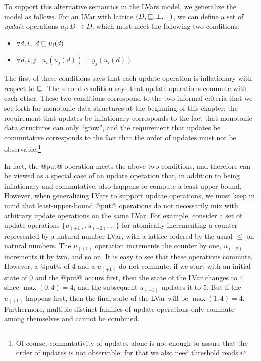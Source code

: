 To support this alternative semantics in the LVars model, we
generalize the model as follows.  For an LVar with lattice $(D,
\sqsubseteq, \bot, \top)$, we can define a set of \emph{update}
operations $u_i : D \rightarrow D$, which must meet the following two
conditions:
\begin{itemize}
\item $\forall d, i.     \;\; d \sqsubseteq u_i(d) $
\item $\forall d, i, j.  \;\; u_i(u_j(d)) = y_j(u_i(d)) $
\end{itemize}
The first of these conditions says that each update operation is
inflationary with respect to $\sqsubseteq$.  The second condition says
that update operations commute with each other.  These two conditions
correspond to the two informal criteria that we set forth for
monotonic data structures at the beginning of this chapter: the
requirement that updates be inflationary corresponds to the fact that
monotonic data structures can only ``grow'', and the requirement that
updates be commutative corresponds to the fact that the order of
updates must not be observable.\footnote{Of course, commutativity of
  updates alone is not enough to assure that the order of updates is
  not observable; for that we also need threshold reads.}


In fact, the @put@ operation meets the above two conditions, and
therefore can be viewed as a special case of an update operation that,
in addition to being inflationary and commutative, also happens to
compute a least upper bound.  However, when generalizing LVars to
support update operations, we must keep in mind that least-upper-bound
@put@ operations do not necessarily mix with arbitrary update
operations on the same LVar.  For example, consider a set of update
operations $\{ u_{(+1)}, u_{(+2)}, \dots \}$ for atomically
incrementing a counter represented by a natural number LVar, with a
lattice ordered by the usual $\leq$ on natural numbers.  The
$u_{(+1)}$ operation increments the counter by one, $u_{(+2)}$
increments it by two, and so on.  It is easy to see that these
operations commute.  However, a @put@ of $4$ and a $u_{(+1)}$ do not
commute: if we start with an initial state of $0$ and the @put@ occurs
first, then the state of the LVar changes to $4$ since $\max(0, 4) =
4$, and the subsequent $u_{(+1)}$ updates it to $5$.  But if the
$u_{(+1)}$ happens first, then the final state of the LVar will be
$\max(1, 4) = 4$.  Furthermore, multiple distinct families of update
operations only commute among themselves and cannot be combined.

